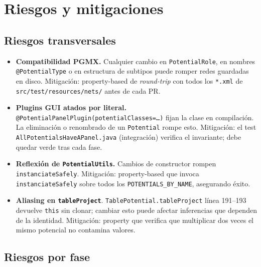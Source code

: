 \documentclass[11pt,a4paper]{article}
\newcommand{\code}[1]{\texttt{#1}}
\begin{document}
\section{Riesgos y mitigaciones}

\subsection{Riesgos transversales}

\begin{itemize}[leftmargin=*]
  \item \textbf{Compatibilidad PGMX.} Cualquier cambio en
        \code{PotentialRole}, en nombres \code{@PotentialType} o en estructura
        de subtipos puede romper redes guardadas en disco. Mitigación:
        property-based de \emph{round-trip} con todos los \code{*.xml} de
        \code{src/test/resources/nets/} antes de cada PR.
  \item \textbf{Plugins GUI atados por literal.}
        \code{@PotentialPanelPlugin(potentialClasses=\dots)} fijan la clase
        en compilación. La eliminación o renombrado de un \code{Potential}
        rompe esto. Mitigación: el test
        \code{AllPotentialsHaveAPanel.java} (integración) verifica el
        invariante; debe quedar verde tras cada fase.
  \item \textbf{Reflexión de \code{PotentialUtils}.} Cambios de constructor
        rompen \code{instanciateSafely}. Mitigación: property-based que
        invoca \code{instanciateSafely} sobre todos los
        \code{POTENTIALS\_BY\_NAME}, asegurando éxito.
  \item \textbf{Aliasing en \code{tableProject}}. \code{TablePotential.tableProject}
        línea 191--193 devuelve \code{this} sin clonar; cambiar esto puede
        afectar inferencias que dependen de la identidad. Mitigación: property
        que verifica que multiplicar dos veces el mismo potencial no
        contamina valores.
\end{itemize}

\subsection{Riesgos por fase}
\end{document}

